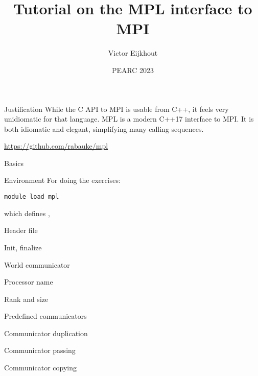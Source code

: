\documentclass[10pt]{beamer}
\newcommand\referenceframe{\begingroup\catcode`\_=12 \referenceframett}
\gdef\referenceframett#1{
  \begin{numberedframe}{Reference: \texttt{MPI_#1}}
    \small
    
  \end{numberedframe}\endgroup}
\begin{document}
\title[MPL]{Tutorial on the MPL interface to MPI}
\author[Eijkhout]{Victor Eijkhout}
\date[2023]{PEARC 2023}

\maketitle

\begin{frame}{Justification}
  While the C API to MPI is usable from C++, it feels very unidiomatic
  for that language.
  \acf{MPL} is a modern C++17 interface to MPI.
  It is both idiomatic and elegant, simplifying many calling sequences.

  \url{https://github.com/rabauke/mpl}
\end{frame}

\makeatletter
{}
\makeatother

 {Basics}

\begin{numberedframe}{Environment}
  For doing the exercises:
\begin{verbatim}
module load mpl
\end{verbatim}
which defines , 
\end{numberedframe}

\begin{numberedframe}{Header file}
  
\end{numberedframe}
\begin{numberedframe}{Init, finalize}
  
\end{numberedframe}
\begin{numberedframe}{World communicator}
  
\end{numberedframe}
\begin{numberedframe}{Processor name}
  
\end{numberedframe}
\begin{numberedframe}{Rank and size}
  
\end{numberedframe}


\begin{numberedframe}{Predefined communicators}
  
\end{numberedframe}
\begin{numberedframe}{Communicator duplication}
  
\end{numberedframe}
\begin{numberedframe}{Communicator passing}
  
\end{numberedframe}
\begin{numberedframe}{Communicator copying}
  
\end{numberedframe}
\end{document}
